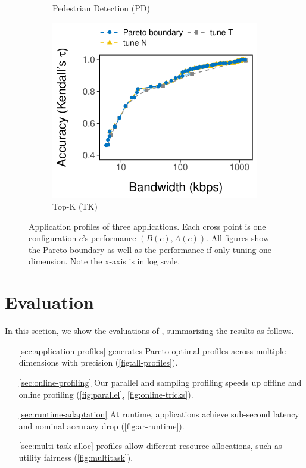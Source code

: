 \begin{figure}[htb]
\begin{subfigure}[t]{0.32\textwidth}
    \caption{Pedestrian Detection (PD)}
    \label{fig:pd-profile}
  \end{subfigure}
  \hfill
  \begin{subfigure}[t]{0.32\textwidth}
    \centering
    \includegraphics[width=\textwidth]{figures/profile-topk.pdf}
    \caption{Top-K (TK)}
    \label{fig:tk-profile}
  \end{subfigure}
  \caption{Application profiles of three applications. Each cross point is one
    configuration $c$'s performance $(B(c), A(c))$. All figures show the Pareto
    boundary as well as the performance if only tuning one dimension. Note the
    x-axis is in log scale.}
  \label{fig:all-profiles}
\end{figure}

\section{Evaluation}
\label{sec:evaluation}

In this section, we show the evaluations of \sysname{}, summarizing the results
as follows.

\begin{itemize}[itemsep=0pt]
\item[\autoref{sec:application-profiles}] \sysname{} generates Pareto-optimal
  profiles across multiple dimensions with precision
  (\autoref{fig:all-profiles}).
\item[\autoref{sec:online-profiling}] Our parallel and sampling profiling speeds
  up offline and online profiling (\autoref{fig:parallel},
  \autoref{fig:online-tricks}).
\item[\autoref{sec:runtime-adaptation}] At runtime, \sysname{} applications
  achieve sub-second latency and nominal accuracy drop
  (\autoref{fig:ar-runtime}).
\item[\autoref{sec:multi-task-alloc}] \sysname{} profiles allow different
  resource allocations, such as utility fairness (\autoref{fig:multitask}).
\end{itemize}

